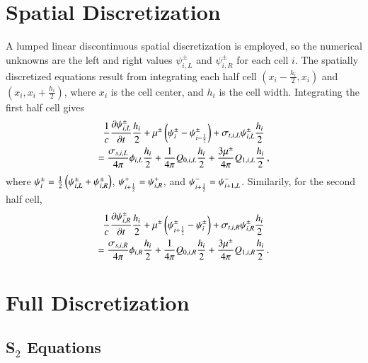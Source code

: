 \documentclass[preprint,12pt]{elsarticle}
\begin{document}
\section{Spatial Discretization}

A lumped linear discontinuous spatial discretization is employed, so the
numerical unknowns are the left and right values $\psi_{i,L}^\pm$ and
$\psi_{i,R}^\pm$ for each cell $i$. The spatially
discretized equations result from integrating each half cell
$(x_i-\frac{h_i}{2},x_i)$ and $(x_i,x_i+\frac{h_i}{2})$,
where $x_i$ is the cell center, and $h_i$ is the cell width.
Integrating the first half cell gives
\begin{multline}
\frac{1}{c}\dxdt{\psi^\pm_{i,L}}\frac{h_i}{2}
  + \mu^\pm\fn{\psi_i^\pm-\psi_{i-\half}^\pm}
  + \sigma_{t,i,L}\psi_{i,L}^\pm\frac{h_i}{2} \\
  = \frac{\sigma_{s,i,L}}{4\pi}\phi_{i,L}\frac{h_i}{2}
  + \frac{1}{4\pi}Q_{0,i,L}\frac{h_i}{2}
  + \frac{3\mu^\pm}{4\pi}Q_{1,i,L}\frac{h_i}{2} \pec
\lequ{S2left}
\end{multline}
where $\psi_i^\pm=\frac{1}{2}\left( \psi_{i,L}^\pm + \psi_{i,R}^\pm \right)$,
$\psi_{i+\frac{1}{2}}^+=\psi_{i,R}^+$, and $\psi_{i+\frac{1}{2}}^-=\psi_{i+1,L}^-$.
Similarily, for the second half cell,
\begin{multline}
\frac{1}{c}\dxdt{\psi^\pm_{i,R}}\frac{h_i}{2}
  + \mu^\pm\fn{\psi_{i+\half}^\pm-\psi_i^\pm}
  + \sigma_{t,i,R}\psi_{i,R}^\pm\frac{h_i}{2} \\
  = \frac{\sigma_{s,i,R}}{4\pi}\phi_{i,R}\frac{h_i}{2}
  + \frac{1}{4\pi}Q_{0,i,R}\frac{h_i}{2}
  + \frac{3\mu^\pm}{4\pi}Q_{1,i,R}\frac{h_i}{2} \pep
\lequ{S2right}
\end{multline}

\section{Full Discretization}
\subsection{S$_2$ Equations}
\end{document}
